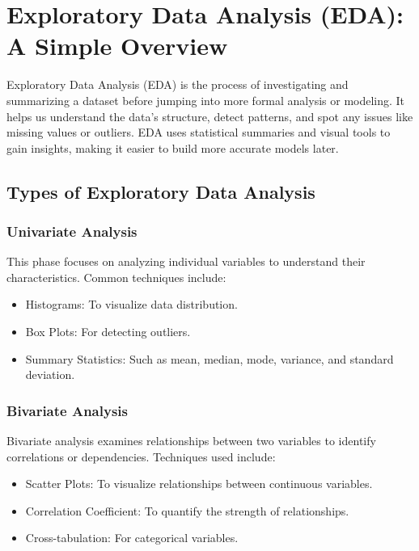 \section{Exploratory Data Analysis (EDA): A Simple Overview}

Exploratory Data Analysis (EDA) is the process of investigating and summarizing a dataset before jumping into more formal analysis or modeling. It helps us understand the data’s structure, detect patterns, and spot any issues like missing values or outliers. EDA uses statistical summaries and visual tools to gain insights, making it easier to build more accurate models later.

\subsection*{Types of Exploratory Data Analysis}

\subsubsection*{Univariate Analysis}  
This phase focuses on analyzing individual variables to understand their characteristics. Common techniques include:
\begin{itemize}
    \item Histograms: To visualize data distribution.
    \item Box Plots: For detecting outliers.
    \item Summary Statistics: Such as mean, median, mode, variance, and standard deviation.
\end{itemize}

\subsubsection*{Bivariate Analysis}  
Bivariate analysis examines relationships between two variables to identify correlations or dependencies. Techniques used include:
\begin{itemize}
    \item Scatter Plots: To visualize relationships between continuous variables.
    \item Correlation Coefficient: To quantify the strength of relationships.
    \item Cross-tabulation: For categorical variables.
\end{itemize}

